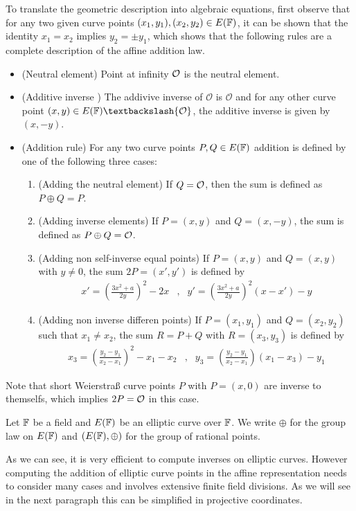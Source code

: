 To translate the geometric description into algebraic equations, first observe that for any two given curve points $(x_1,y_1), (x_2,y_2)\in E(\mathbb{F})$, it can be shown that the identity $x_1=x_2$ implies $y_2=\pm y_1$, which shows that the following rules are a complete description of the affine addition law.
\begin{itemize}
\item (Neutral element) Point at infinity $\mathcal{O}$ is the neutral element.
\item (Additive inverse ) The addivive inverse of $\mathcal{O}$ is $\mathcal{O}$ and for any other curve point $(x,y) \in E(\F)\textbackslash \{\mathcal{O}\}$, the additive inverse is given by $(x,-y)$.
\item (Addition rule) For any two curve points $P, Q \in E(\mathbb{F})$ addition is defined by one of the following three cases:
\begin{enumerate}
\item (Adding the neutral element) If $Q=\mathcal{O}$, then the sum is defined as $P\oplus Q=P$.
\item (Adding inverse elements)  If $P=(x,y)$ and $Q=(x,-y)$, the sum is defined as $P\oplus Q=\mathcal{O}$.
\item (Adding non self-inverse equal points) If $P=(x,y)$ and $Q=(x,y)$ with $y\neq 0$, the sum $2P=(x',y')$ is defined by
$$
\begin{array}{llr}
x' = \left(\frac{3x^2+a}{2y}\right)^2 -2x &,&
y' = \left(\frac{3x^2+a}{2y}\right)^2\left(x-x'\right) - y
\end{array} 
$$
\item (Adding non inverse differen points) If $P=(x_1,y_1)$ and $Q=(x_2,y_2)$ such that $x_1 \neq x_2$, the sum $R=P+Q$ with $R=(x_3,y_3)$ is defined by
$$
\begin{array}{llr}
x_3 = \left(\frac{y_2-y_1}{x_2-x_1}\right)^2 -x_1-x_2 &, &
y_3 = \left(\frac{y_2-y_1}{x_2-x_1} \right)\left(x_1-x_3\right) - y_1
\end{array} 
$$
\end{enumerate}
\end{itemize} 
Note that short Weierstraß curve points $P$ with $P=(x,0)$ are inverse to themselfs, which implies $2P=\mathcal{O}$ in this case.
\begin{notation}
Let $\mathbb{F}$ be a field and $E(\mathbb{F})$ be an elliptic curve over $\mathbb{F}$. We write $\oplus$ for the group law on $E(\mathbb{F})$ and $(E(\mathbb{F}),\oplus)$ for the group of rational points.
\end{notation}
As we can see, it is very efficient to compute inverses on elliptic curves. However computing the addition of elliptic curve points in the affine representation needs to consider many cases and involves extensive finite field divisions. As we will see in the next paragraph this can be simplified in projective coordinates.

